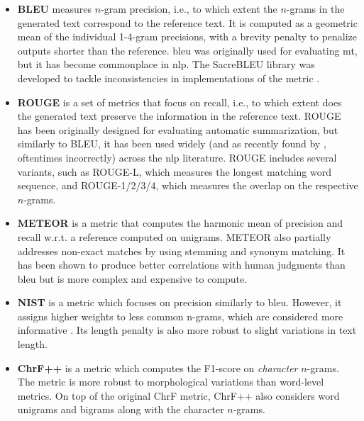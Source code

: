 {\begin{itemize}
    \item \textbf{BLEU} \cite{papineni2002bleu} measures $n$-gram precision, i.e., to which extent the $n$-grams in the generated text correspond to the reference text.  It is computed as a geometric mean of the individual 1-4-gram precisions, with a brevity penalty to penalize outputs shorter than the reference. \acs{bleu} was originally used for evaluating \ac{mt}, but it has become commonplace in \ac{nlp}. The SacreBLEU library \cite{post2018call}  was developed to tackle inconsistencies in implementations of the metric \cite{reiter2018structured}.
    \item \textbf{ROUGE} \cite{lin-2004-rouge} is a set of metrics that focus on recall, i.e., to which extent does the generated text preserve the information in the reference text. ROUGE has been originally designed for evaluating automatic summarization, but similarly to BLEU, it has been used widely (and as recently found by \citet{gruskyRogueScores2023}, oftentimes incorrectly) across the \ac{nlp} literature. ROUGE includes several variants, such as ROUGE-L, which measures the longest matching word sequence, and ROUGE-{1/2/3/4}, which measures the overlap on the respective $n$-grams.
    \item \textbf{METEOR} \cite{banerjee-lavie-2005-meteor} is a metric that computes the harmonic mean of precision and recall w.r.t. a reference computed on unigrams. METEOR also partially addresses non-exact matches by using stemming and synonym matching. It has been shown to produce better correlations with human judgments than \acs{bleu} \cite{agarwal2008meteor} but is more complex and expensive to compute.
    \item \textbf{NIST} \cite{martin2000nist} is a metric which focuses on precision similarly to \acs{bleu}. However, it assigns higher weights to less common n-grams, which are considered more informative \cite{doddington2002automatic}. Its length penalty is also more robust to slight variations in text length.
    \item \textbf{ChrF++} \cite{popovic2015chrf,popovic2017chrf} is a metric which computes the F1-score on \emph{character} $n$-grams. The metric is more robust to morphological variations than word-level metrics. On top of the original ChrF metric, ChrF++ also considers word unigrams and bigrams along with the character $n$-grams.
\end{itemize}
}
